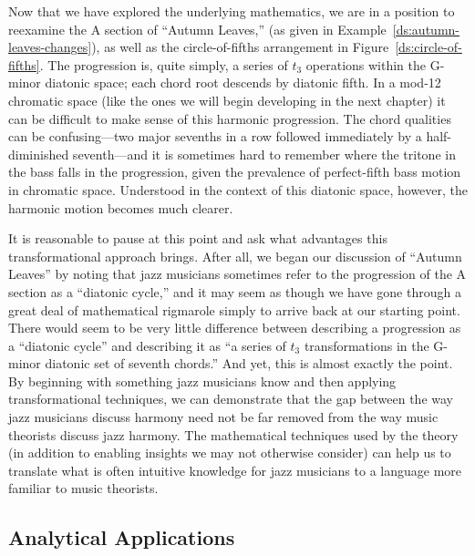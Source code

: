 \documentclass[diss]{subfiles}
\begin{document}
Now that we have explored the underlying mathematics, we are in a position to
reexamine the A section of “Autumn Leaves,” (as given in
Example~\ref{ds:autumn-leaves-changes}), as well as the circle-of-fifths
arrangement in Figure~\ref{ds:circle-of-fifths}. The progression is, quite
simply, a series of $t_3$ operations within the G-minor diatonic space; each
chord root descends by diatonic fifth. In a mod-12 chromatic space (like the
ones we will begin developing in the next chapter) it can be difficult to make
sense of this harmonic progression. The chord qualities can be confusing---two
major sevenths in a row followed immediately by a half-diminished
seventh---and it is sometimes hard to remember where the tritone in the bass
falls in the progression, given the prevalence of perfect-fifth bass motion in
chromatic space. Understood in the context of this diatonic space, however,
the harmonic motion becomes much clearer.

It is reasonable to pause at this point and ask what advantages this
transformational approach brings. After all, we began our discussion of
“Autumn Leaves” by noting that jazz musicians sometimes refer to the
progression of the A section as a “diatonic cycle,” and it may seem as though
we have gone through a great deal of mathematical rigmarole simply to arrive
back at our starting point. There would seem to be very little difference
between describing a progression as a “diatonic cycle” and describing it as “a
series of $t_3$ transformations in the G-minor diatonic set of seventh
chords.” And yet, this is almost exactly the point. By beginning with
something jazz musicians know and then applying transformational techniques,
we can demonstrate that the gap between the way jazz musicians discuss harmony
need not be far removed from the way music theorists discuss jazz harmony. The
mathematical techniques used by the theory (in addition to enabling insights
we may not otherwise consider) can help us to translate what is often
intuitive knowledge for jazz musicians to a language more familiar to music
theorists.


\subsection{Analytical Applications}
\label{subsec:analytical-applications} %
\FloatBarrier
\end{document}
